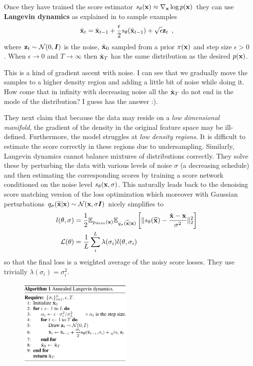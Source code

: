 Once they have trained the score estimator $s_{\theta}({\mathbf{x}}) \approx \nabla_{{\mathbf{x}}} \log p({\mathbf{x}})$ they can use \textbf{Langevin dynamics} as explained in \cite{welling_bayesian_2011} to sample examples
\begin{align*}
\hat{{\mathbf{x}}}_t = \hat{{\mathbf{x}}}_{t-1} + \frac{\epsilon}{2} s_{\theta}(\hat{{\mathbf{x}}}_{t-1}) + \sqrt{\epsilon} {\mathbf{z}}_t \enspace , 
\end{align*}
where ${\mathbf{z}}_t \sim \mathcal{N}(0, {\bm{I}})$ is the noise, $\hat{{\mathbf{x}}}_0$ sampled from a prior $\pi({\mathbf{x}})$ and step size $\epsilon > 0$.
When $\epsilon \to 0$ and $T \to \infty$ then $\hat{{\mathbf{x}}}_T$ has the same distribution as the desired $p({\mathbf{x}})$. 
\begin{notebox}
This is a kind of gradient ascent with noise. I can see that we gradually move the samples to a higher density region and adding a little bit of noise while doing it. How come that in infinity with decreasing noise all the $\hat{{\mathbf{x}}}_T$ do not end in the mode of the distribution? I guess \cite{welling_bayesian_2011} has the answer :).
\end{notebox}

They next claim that because the data may reside on a \emph{low dimensional manifold}, the gradient of the density in the original feature space may be ill-defined.
Furthermore, the model struggles at \emph{low density regions}. It is difficult to estimate the score correctly in these regions due to undersampling. Similarly, Langevin dynamics cannot balance mixtures of distributions correctly. 
They solve these by perturbing the data with various levels of noise $\sigma$ (a decreasing schedule) and then estimating the corresponding scores by training a score network conditioned on the noise level $s_{\theta}({\mathbf{x}}, \sigma)$.
This naturally leads back to the denoising score matching version of the loss optimization which moreover with Gaussian perturbations $q_\sigma(\widetilde{{\mathbf{x}}}|{\mathbf{x}}) \sim \mathcal{N}({\mathbf{x}}, \sigma{\bm{I}})$ nicely simplifies to 
\begin{align*}
l(\theta, \sigma) & = \frac{1}{2} \mathbb{E}_{p_{data}({\mathbf{x}})} \mathbb{E}_{q_\sigma(\widetilde{{\mathbf{x}}}|{\mathbf{x}})} \left[ \Vert s_{\theta}(\widetilde{{\mathbf{x}}}) - \frac{\tilde{{\mathbf{x}}} - {\mathbf{x}}}{\sigma^2} \Vert_2^2 \right] \\
\mathcal{L}(\theta) & = \frac{1}{L}\sum_i^L \lambda(\sigma_i) l(\theta, \sigma_i)
\end{align*}
so that the final loss is a weighted average of the noisy score losses. They use trivially $\lambda(\sigma_i) = \sigma_i^2$.
\begin{figure}
\centering
\includegraphics[width=0.5\textwidth]{scoreBased_Algo.png}
\end{figure}

